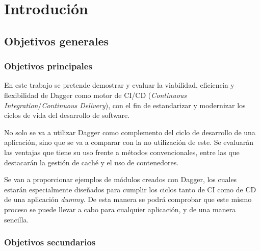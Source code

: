\chapter{Introdución}


\section{Objetivos generales}


\subsection*{Objetivos principales}

En este trabajo se pretende demostrar y evaluar la viabilidad, eficiencia y flexibilidad de Dagger\cite{dagger} como motor de CI/CD (\textit{Continuous Integration}/\textit{Continuous Delivery})\cite{ci,cd}, con el fin de estandarizar y modernizar los ciclos de vida del desarrollo de software.

No solo se va a utilizar Dagger como complemento del ciclo de desarrollo de una aplicación, sino que se va a comparar con la no utilización de este. Se evaluarán las ventajas que tiene su uso frente a métodos convencionales, entre las que destacarán la gestión de caché y el uso de contenedores.

Se van a proporcionar ejemplos de módulos creados con Dagger, los cuales estarán especialmente diseñados para cumplir los ciclos tanto de CI  como de CD  de una aplicación \textit{dummy}. De esta manera se podrá comprobar que este mismo proceso se puede llevar a cabo para cualquier aplicación, y de una manera sencilla.

\subsection*{Objetivos secundarios}

